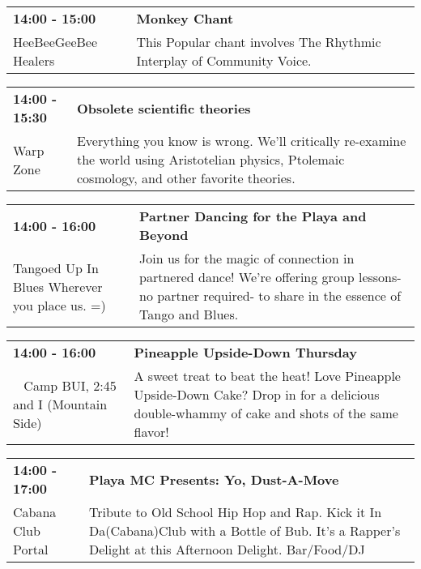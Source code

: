 \begin{tabular}{ p{1in} p{2.2in} }
    \textbf{14:00 - 15:00} & \textbf{Monkey  Chant} \\
    HeeBeeGeeBee Healers \newline  & This Popular chant involves The Rhythmic Interplay of Community Voice. \\
    \hline 
\end{tabular}
    
\begin{tabular}{ p{1in} p{2.2in} }
    \textbf{14:00 - 15:30} & \textbf{Obsolete scientific theories} \\
    Warp Zone \newline  & Everything you know is wrong. We'll critically re-examine the world using Aristotelian physics, Ptolemaic cosmology, and other favorite theories. \\
    \hline 
\end{tabular}
    
\begin{tabular}{ p{1in} p{2.2in} }
    \textbf{14:00 - 16:00} & \textbf{Partner Dancing for the Playa and Beyond} \\
    Tangoed Up In Blues \newline Wherever you place us. =) & Join us for the magic of connection in partnered dance! We're offering group lessons-no partner required- to share in the essence of Tango and Blues. \\
    \hline 
\end{tabular}
    
\begin{tabular}{ p{1in} p{2.2in} }
    \textbf{14:00 - 16:00} & \textbf{Pineapple Upside-Down Thursday} \\
    ~ \newline Camp BUI, 2:45 and I (Mountain Side) & A sweet treat to beat the heat!  Love Pineapple Upside-Down Cake? Drop in for a delicious double-whammy of cake and shots of the same flavor! \\
    \hline 
\end{tabular}
    
\begin{tabular}{ p{1in} p{2.2in} }
    \textbf{14:00 - 17:00} & \textbf{Playa MC Presents: Yo, Dust-A-Move} \\
    Cabana Club \newline 430 Portal & Tribute to Old School Hip Hop and Rap. Kick it In Da(Cabana)Club with a Bottle of Bub. It's a Rapper's Delight at this Afternoon Delight. Bar/Food/DJ \\
    \hline 
\end{tabular}
    
